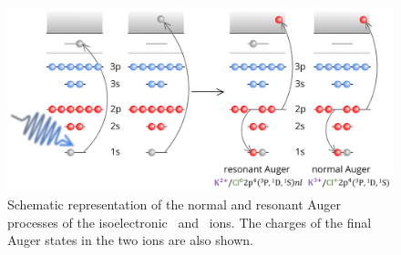 \begin{figure}
\includegraphics[scale=0.8]{figures/auger_process.pdf}
\caption{Schematic representation of the normal and resonant Auger processes of the isoelectronic \ki~and \cli~ions. The charges of the final Auger states in the two ions are also shown.}
\label{fg:auger}
\end{figure}